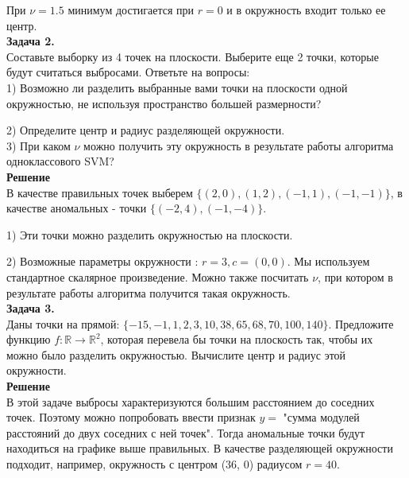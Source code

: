 При $\nu = 1.5$ минимум достигается при $r = 0$ и в окружность входит только ее центр. \\

\textbf{Задача 2.} \\

Составьте выборку из 4 точек на плоскости. Выберите еще 2 точки, которые будут считаться выбросами. Ответьте на вопросы: \\

1) Возможно ли разделить выбранные вами точки на плоскости одной окружностью, не используя пространство большей размерности?

2) Определите центр и радиус разделяющей окружности. \\

3) При каком $\nu$ можно получить эту окружность в результате работы алгоритма одноклассового SVM?\\

\textbf{Решение} \\

В качестве правильных точек выберем $\{(2,0), (1,2), (-1,1), (-1,-1)\}$, в качестве аномальных - точки $\{(-2,4), (-1,-4)\}$.

1) Эти точки можно разделить окружностью на плоскости.

2) Возможные параметры окружности : $r = 3, c = (0,0)$. Мы используем стандартное скалярное произведение. Можно также посчитать $\nu$, при котором в результате работы алгоритма получится такая окружность. \\ 

\textbf{Задача 3.} \\

Даны точки на прямой: $\{-15, -1, 1, 2, 3, 10, 38, 65, 68, 70, 100, 140\}$. Предложите функцию $f: \mathbb{R} \rightarrow \mathbb{R}^2$, которая перевела бы точки на плоскость так, чтобы их можно было разделить окружностью. Вычислите центр и радиус этой окружности.\\

\textbf{Решение} \\

В этой задаче выбросы характеризуются большим расстоянием до соседних точек. Поэтому можно попробовать ввести признак $y = $ "сумма модулей расстояний до двух соседних с ней точек". Тогда аномальные точки будут находиться на графике выше правильных. В качестве разделяющей окружности подходит, например, окружность с центром (36, 0) радиусом $r = 40$.

